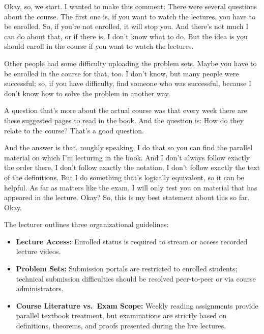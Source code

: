 \begin{speech}[00:00:00 - 00:01:26]
Okay, so, we start. I wanted to make this comment: There were several questions about the course. The first one is, if you want to watch the lectures, you have to be enrolled. So, if you're not enrolled, it will stop you. And there's not much I can do about that, or if there is, I don't know what to do. But the idea is you should enroll in the course if you want to watch the lectures.

Other people had some difficulty uploading the problem sets. Maybe you have to be enrolled in the course for that, too. I don't know, but many people were successful; so, if you have difficulty, find someone who was successful, because I don't know how to solve the problem in another way.

A question that's more about the actual course was that every week there are these suggested pages to read in the book. And the question is: How do they relate to the course? That's a good question.

And the answer is that, roughly speaking, I do that so you can find the parallel material on which I'm lecturing in the book. And I don't always follow exactly the order there, I don't follow exactly the notation, I don't follow exactly the text of the definitions. But I do something that's logically equivalent, so it can be helpful. As far as matters like the exam, I will only test you on material that has appeared in the lecture. Okay? So, this is my best statement about this so far. Okay.
\end{speech}

\begin{note}
The lecturer outlines three organizational guidelines:
\begin{itemize}
    \item \textbf{Lecture Access:} Enrolled status is required to stream or access recorded lecture videos.
    \item \textbf{Problem Sets:} Submission portals are restricted to enrolled students; technical submission difficulties should be resolved peer-to-peer or via course administrators.
    \item \textbf{Course Literature vs.\ Exam Scope:} Weekly reading assignments provide parallel textbook treatment, but examinations are strictly based on definitions, theorems, and proofs presented during the live lectures.
\end{itemize}
\end{note}

